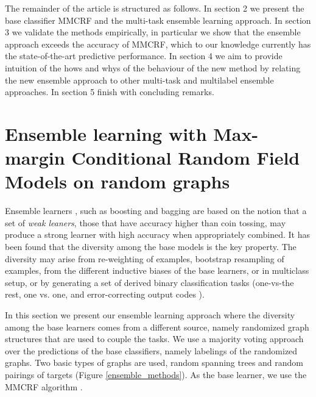 \documentclass[runningheads,a4paper]{llncs}
\begin{document}
The remainder of the article is structured as follows. In section 2 we present the base classifier MMCRF and the multi-task ensemble learning approach. In section 3
we validate the methods empirically, in particular we show that the ensemble approach exceeds the accuracy of MMCRF, which to our knowledge currently has the state-of-the-art predictive performance. In section 4 we aim to provide intuition of the hows and whys of the behaviour of the new method by relating the new ensemble approach to other multi-task and multilabel ensemble approaches. In section 5 finish with concluding remarks.



\section{Ensemble learning with Max-margin Conditional Random Field Models on random graphs}

Ensemble learners \cite{dietterich2000ensemble,Opitz99}, such as boosting \cite{SchSin00} and bagging \cite{Breiman96} are based on the notion that a set of {\em weak leaners}, those that have accuracy higher than coin tossing, may produce a strong learner with high accuracy when appropriately combined. It has been found that the diversity among the base models is the key property. The diversity may arise from re-weighting of examples, bootstrap resampling of examples, from the different inductive biases of the base learners, or  in multiclass setup, or by generating a set of derived binary classification tasks (one-vs-the rest, one vs. one, and error-correcting output codes \cite{dietterich2000ensemble}).

In this section we present our ensemble learning approach where the diversity among the base learners comes from a different source, namely randomized graph structures
that are used to couple the tasks. We use a  majority voting approach over the predictions of the base classifiers, namely labelings of the randomized graphs. Two basic types of graphs are used, random spanning trees and random pairings of targets (Figure \ref{ensemble_methods}). As the base learner, we use the MMCRF algorithm  \cite{rousu2007}. 
\end{document}
